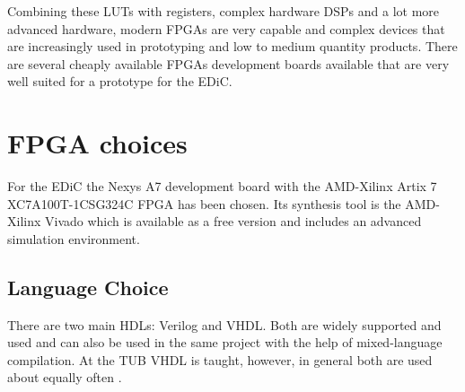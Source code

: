 Combining these \glspl{LUT} with registers, complex hardware \glspl{DSP} and a lot more advanced hardware, modern \glspl{FPGA} are very capable and complex devices that are increasingly used in prototyping and low to medium quantity products.
There are several cheaply available \glspl{FPGA} development boards available that are very well suited for a prototype for the \gls{EDiC}.

\section{\gls{FPGA} choices}
For the \gls{EDiC} the Nexys A7 development board \cite{nexysA7} with the AMD-Xilinx Artix 7 XC7A100T-1CSG324C \gls{FPGA} has been chosen.
Its synthesis tool is the AMD-Xilinx Vivado \cite{vivado} which is available as a free version and includes an advanced simulation environment.

\subsection{Language Choice}
There are two main \glspl{HDL}: Verilog and \gls{VHDL}.
Both are widely supported and used and can also be used in the same project with the help of mixed-language compilation.
At the \gls{TUB} \gls{VHDL} is taught, however, in general both are used about equally often \cite{vhdlVerilog}.





